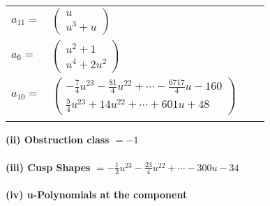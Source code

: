\documentclass[1p]{elsarticle_modified}
\theoremstyle{definition}
\begin{document}
\begin{tabular}{m{7pt} m{180pt} m{7pt} m{180pt} }
\flushright $a_{11}=$&$\begin{pmatrix}u\\u^3+u\end{pmatrix}$ \\
\flushright $a_{6}=$&$\begin{pmatrix}u^2+1\\u^4+2 u^2\end{pmatrix}$ \\
\flushright $a_{10}=$&$\begin{pmatrix}-\frac{7}{4} u^{23}-\frac{81}{4} u^{22}+\cdots-\frac{6717}{4} u-160\\\frac{5}{4} u^{23}+14 u^{22}+\cdots+601 u+48\end{pmatrix}$\\&\end{tabular}
\flushleft \textbf{(ii) Obstruction class $= -1$}\\~\\
\flushleft \textbf{(iii) Cusp Shapes $= -\frac{1}{2} u^{23}-\frac{23}{4} u^{22}+\cdots-300 u-34$}\\~\\
\newpage\renewcommand{\arraystretch}{1}
\flushleft \textbf{(iv) u-Polynomials at the component}\newline \\
\end{document}
